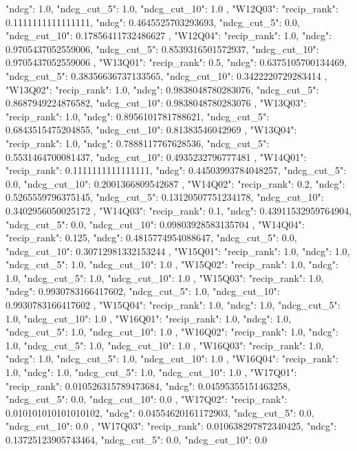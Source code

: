 {{  "ndcg": 1.0,
  "ndcg_cut_5": 1.0,
  "ndcg_cut_10": 1.0
 },
 "W12Q03": {
  "recip_rank": 0.1111111111111111,
  "ndcg": 0.4645525703293693,
  "ndcg_cut_5": 0.0,
  "ndcg_cut_10": 0.17856411732486627
 },
 "W12Q04": {
  "recip_rank": 1.0,
  "ndcg": 0.9705437052559006,
  "ndcg_cut_5": 0.8539316501572937,
  "ndcg_cut_10": 0.9705437052559006
 },
 "W13Q01": {
  "recip_rank": 0.5,
  "ndcg": 0.6375105700134469,
  "ndcg_cut_5": 0.38356636737133565,
  "ndcg_cut_10": 0.3422220729283414
 },
 "W13Q02": {
  "recip_rank": 1.0,
  "ndcg": 0.9838048780283076,
  "ndcg_cut_5": 0.8687949224876582,
  "ndcg_cut_10": 0.9838048780283076
 },
 "W13Q03": {
  "recip_rank": 1.0,
  "ndcg": 0.8956101781788621,
  "ndcg_cut_5": 0.6843515475204855,
  "ndcg_cut_10": 0.81383546042969
 },
 "W13Q04": {
  "recip_rank": 1.0,
  "ndcg": 0.7888117767628536,
  "ndcg_cut_5": 0.5531464700081437,
  "ndcg_cut_10": 0.4935232796777481
 },
 "W14Q01": {
  "recip_rank": 0.1111111111111111,
  "ndcg": 0.44503993784048257,
  "ndcg_cut_5": 0.0,
  "ndcg_cut_10": 0.2001366809542687
 },
 "W14Q02": {
  "recip_rank": 0.2,
  "ndcg": 0.5265559796375145,
  "ndcg_cut_5": 0.13120507751234178,
  "ndcg_cut_10": 0.3402956050025172
 },
 "W14Q03": {
  "recip_rank": 0.1,
  "ndcg": 0.43911532959764904,
  "ndcg_cut_5": 0.0,
  "ndcg_cut_10": 0.09803928583135704
 },
 "W14Q04": {
  "recip_rank": 0.125,
  "ndcg": 0.4815774954088647,
  "ndcg_cut_5": 0.0,
  "ndcg_cut_10": 0.30712981332153244
 },
 "W15Q01": {
  "recip_rank": 1.0,
  "ndcg": 1.0,
  "ndcg_cut_5": 1.0,
  "ndcg_cut_10": 1.0
 },
 "W15Q02": {
  "recip_rank": 1.0,
  "ndcg": 1.0,
  "ndcg_cut_5": 1.0,
  "ndcg_cut_10": 1.0
 },
 "W15Q03": {
  "recip_rank": 1.0,
  "ndcg": 0.9930783166417602,
  "ndcg_cut_5": 1.0,
  "ndcg_cut_10": 0.9930783166417602
 },
 "W15Q04": {
  "recip_rank": 1.0,
  "ndcg": 1.0,
  "ndcg_cut_5": 1.0,
  "ndcg_cut_10": 1.0
 },
 "W16Q01": {
  "recip_rank": 1.0,
  "ndcg": 1.0,
  "ndcg_cut_5": 1.0,
  "ndcg_cut_10": 1.0
 },
 "W16Q02": {
  "recip_rank": 1.0,
  "ndcg": 1.0,
  "ndcg_cut_5": 1.0,
  "ndcg_cut_10": 1.0
 },
 "W16Q03": {
  "recip_rank": 1.0,
  "ndcg": 1.0,
  "ndcg_cut_5": 1.0,
  "ndcg_cut_10": 1.0
 },
 "W16Q04": {
  "recip_rank": 1.0,
  "ndcg": 1.0,
  "ndcg_cut_5": 1.0,
  "ndcg_cut_10": 1.0
 },
 "W17Q01": {
  "recip_rank": 0.010526315789473684,
  "ndcg": 0.04595355151463258,
  "ndcg_cut_5": 0.0,
  "ndcg_cut_10": 0.0
 },
 "W17Q02": {
  "recip_rank": 0.010101010101010102,
  "ndcg": 0.04554620161172903,
  "ndcg_cut_5": 0.0,
  "ndcg_cut_10": 0.0
 },
 "W17Q03": {
  "recip_rank": 0.010638297872340425,
  "ndcg": 0.13725123905743464,
  "ndcg_cut_5": 0.0,
  "ndcg_cut_10": 0.0
}}
